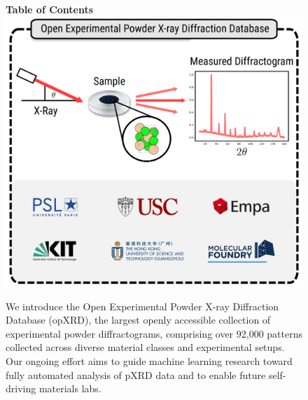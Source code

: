 \documentclass[a4paper]{article}
\begin{document}
\begin{figure}
\centering
\textbf{Table of Contents}\\
\medskip
  \includegraphics{figures/TOC.png}
  \medskip
  \caption*{We introduce the Open Experimental Powder X-ray Diffraction Database (opXRD), the largest openly accessible collection of experimental powder diffractograms, comprising over 92,000 patterns collected across diverse material classes and experimental setups. Our ongoing effort aims to guide machine learning research toward fully automated analysis of pXRD data and to enable future self-driving materials labs.}
\end{figure}

\printnomenclature




\setcounter{section}{0}
\renewcommand{\thesection}{S\arabic{section}}
\setcounter{figure}{0}
\renewcommand{\thefigure}{S\arabic{figure}}
\setcounter{table}{0}
\renewcommand{\thetable}{S\arabic{table}}
\end{document}
